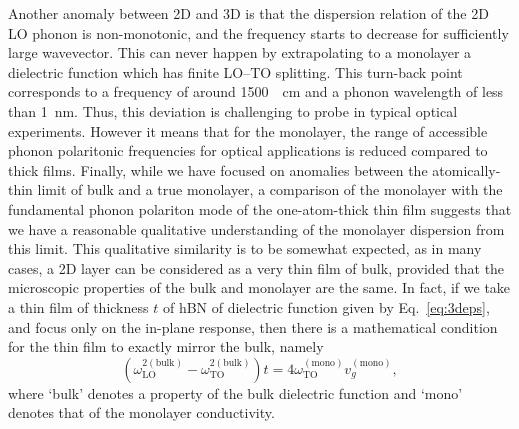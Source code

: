 \documentclass[aps,prb,twocolumn,
	           groupedaddress,superscriptaddress,
               amsfonts,amssymb,amsmath,floatfix,
	           citeautoscript]{revtex4-1}
\begin{document}
Another anomaly between 2D and 3D is that the dispersion relation of the 2D LO phonon is non-monotonic, and the frequency starts to decrease for sufficiently large wavevector. This can never happen by extrapolating to a monolayer a dielectric function which has finite LO--TO splitting. This turn-back point corresponds to a frequency of around \SI{1500}{\per\cm} and a phonon wavelength of less than \SI{1}{\nm}. Thus, this deviation is challenging to probe in typical optical experiments. However it means that for the monolayer, the range of accessible phonon polaritonic frequencies for optical applications is reduced compared to thick films. Finally, while we have focused on anomalies between the atomically-thin limit of bulk and a true monolayer, a comparison of the monolayer with the fundamental phonon polariton mode of the one-atom-thick thin film suggests that we have a reasonable qualitative understanding of the monolayer dispersion from this limit. This qualitative similarity is to be somewhat expected, as in many cases, a 2D layer can be considered as a very thin film of bulk, provided that the microscopic properties of the bulk and monolayer are the same. In fact, if we take a thin film of thickness $t$ of hBN of dielectric function given by Eq.~\eqref{eq:3deps}, and focus only on the in-plane response, then there is a mathematical condition for the thin film to exactly mirror the bulk, namely
\begin{equation}
(\omega^{2 (\mathrm{bulk})}_{\mathrm{LO}} - \omega^{2 (\mathrm{bulk})}_{\mathrm{TO}})t = 4\omega^{(\mathrm{mono})}_{\mathrm{TO}}v^{(\mathrm{mono})}_g,
\end{equation}
where `bulk' denotes a property of the bulk dielectric function and `mono' denotes that of the monolayer conductivity.

\end{document}
